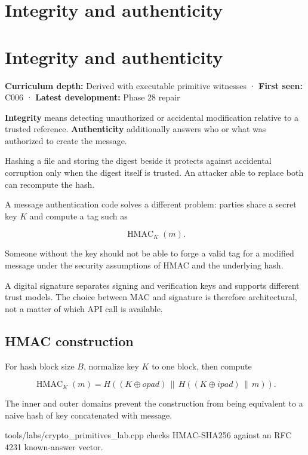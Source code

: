 \hypertarget{appendix-cbe594d1ab0a}{}
\section*{Integrity and authenticity}
\section{Integrity and authenticity}\label{appendix-cbe594d1ab0a-integrity-and-authenticity}

\textbf{Curriculum depth:} Derived with executable primitive witnesses · \textbf{First seen:} C006 · \textbf{Latest development:} Phase 28 repair

\textbf{Integrity} means detecting unauthorized or accidental modification relative to a trusted reference. \textbf{Authenticity} additionally answers who or what was authorized to create the message.

Hashing a file and storing the digest beside it protects against accidental corruption only when the digest itself is trusted. An attacker able to replace both can recompute the hash.

A message authentication code solves a different problem: parties share a secret key \(K\) and compute a tag such as

\[
\operatorname{HMAC}_K(m).
\]

Someone without the key should not be able to forge a valid tag for a modified message under the security assumptions of HMAC and the underlying hash.

A digital signature separates signing and verification keys and supports different trust models. The choice between MAC and signature is therefore architectural, not a matter of which API call is available.

\subsection{HMAC construction}\label{appendix-cbe594d1ab0a-hmac-construction}

For hash block size \(B\), normalize key \(K\) to one block, then compute

\[
\operatorname{HMAC}_K(m)
=
H((K\oplus opad)\,\|\,
  H((K\oplus ipad)\,\|\,m)).
\]

The inner and outer domains prevent the construction from being equivalent to a naive hash of key concatenated with message.

tools/labs/crypto\_primitives\_lab.cpp checks HMAC-SHA256 against an RFC 4231 known-answer vector.

